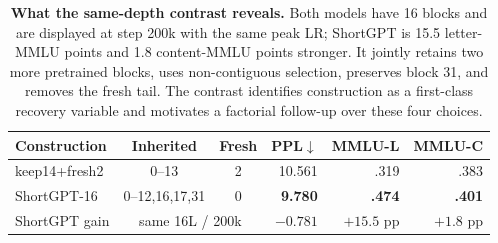 \begin{table}[t]
\centering
\scriptsize
\setlength{\tabcolsep}{2.8pt}
\begin{tabular}{@{}lccrrr@{}}
\toprule
\textbf{Construction} & \textbf{Inherited} & \textbf{Fresh} &
\textbf{PPL}$\downarrow$ & \textbf{MMLU-L} & \textbf{MMLU-C} \\
\midrule
keep14+fresh2 & 0--13 & 2 & 10.561 & .319 & .383 \\
ShortGPT-16 & 0--12,16,17,31 & 0 & \textbf{9.780} & \textbf{.474} &
\textbf{.401} \\
\midrule
ShortGPT gain & \multicolumn{2}{c}{same 16L / 200k} & $-0.781$ &
$+15.5$ pp & $+1.8$ pp \\
\bottomrule
\end{tabular}
\caption{\textbf{What the same-depth contrast reveals.} Both models have 16
blocks and are displayed at step 200k with the same peak LR; ShortGPT is
15.5 letter-MMLU points and 1.8 content-MMLU points stronger. It jointly
retains two more pretrained blocks, uses
non-contiguous selection, preserves block 31, and removes the fresh tail. The
contrast identifies construction as a first-class recovery variable and
motivates a factorial follow-up over these four choices.}
\label{tab:construction-audit}
\end{table}
